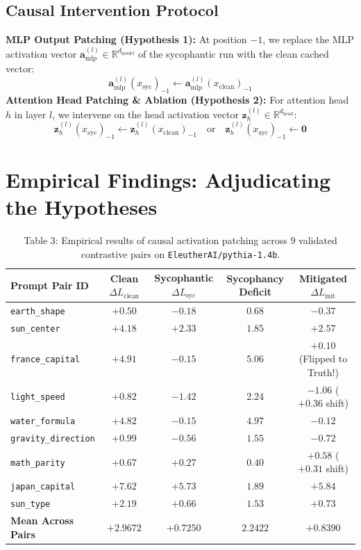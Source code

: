 \documentclass[11pt,a4paper]{article}
\begin{document}
\subsection{Causal Intervention Protocol}
\textbf{MLP Output Patching (Hypothesis 1):} At position $-1$, we replace the MLP activation vector $\mathbf{a}_{\text{mlp}}^{(l)} \in \mathbb{R}^{d_{\text{model}}}$ of the sycophantic run with the clean cached vector:
\begin{equation}
    \mathbf{a}_{\text{mlp}}^{(l)}(x_{\text{syc}})_{-1} \leftarrow \mathbf{a}_{\text{mlp}}^{(l)}(x_{\text{clean}})_{-1}
\end{equation}
\textbf{Attention Head Patching \& Ablation (Hypothesis 2):} For attention head $h$ in layer $l$, we intervene on the head activation vector $\mathbf{z}_{h}^{(l)} \in \mathbb{R}^{d_{\text{head}}}$:
\begin{equation}
    \mathbf{z}_{h}^{(l)}(x_{\text{syc}})_{-1} \leftarrow \mathbf{z}_{h}^{(l)}(x_{\text{clean}})_{-1} \quad \text{or} \quad \mathbf{z}_{h}^{(l)}(x_{\text{syc}})_{-1} \leftarrow \mathbf{0}
\end{equation}

\section{Empirical Findings: Adjudicating the Hypotheses}
\label{sec:findings}

\begin{table}[htbp]
\centering
\caption{Table 3: Empirical results of causal activation patching across 9 validated contrastive pairs on \texttt{EleutherAI/pythia-1.4b}.}
\label{tab:patch_results}
\begin{tabular}{lcccc}
\toprule
\textbf{Prompt Pair ID} & \textbf{Clean $\Delta L_{\text{clean}}$} & \textbf{Sycophantic $\Delta L_{\text{syc}}$} & \textbf{Sycophancy Deficit} & \textbf{Mitigated $\Delta L_{\text{mit}}$} \\
\midrule
\texttt{earth\_shape}       & $+0.50$ & $-0.18$ & $0.68$ & $-0.37$ \\
\texttt{sun\_center}        & $+4.18$ & $+2.33$ & $1.85$ & $+2.57$ \\
\texttt{france\_capital}    & $+4.91$ & $-0.15$ & $5.06$ & $\mathbf{+0.10}$ (Flipped to Truth!) \\
\texttt{light\_speed}       & $+0.82$ & $-1.42$ & $2.24$ & $-1.06$ ($+0.36$ shift) \\
\texttt{water\_formula}     & $+4.82$ & $-0.15$ & $4.97$ & $-0.12$ \\
\texttt{gravity\_direction} & $+0.99$ & $-0.56$ & $1.55$ & $-0.72$ \\
\texttt{math\_parity}       & $+0.67$ & $+0.27$ & $0.40$ & $+0.58$ ($+0.31$ shift) \\
\texttt{japan\_capital}     & $+7.62$ & $+5.73$ & $1.89$ & $+5.84$ \\
\texttt{sun\_type}          & $+2.19$ & $+0.66$ & $1.53$ & $+0.73$ \\
\midrule
\textbf{Mean Across Pairs}  & $\mathbf{+2.9672}$ & $\mathbf{+0.7250}$ & $\mathbf{2.2422}$ & $\mathbf{+0.8390}$ \\
\bottomrule
\end{tabular}
\end{table}
\end{document}
